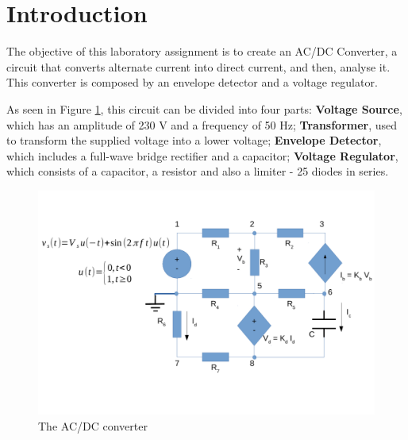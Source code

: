 \section{Introduction}
\label{sec:introduction}

The objective of this laboratory assignment is to create an AC/DC Converter, a circuit that converts alternate current into direct current, and then, analyse it. This converter is composed by an envelope detector and a voltage regulator.

As seen in Figure \ref{fig:rc}, this circuit can be divided into four parts: \textbf{Voltage Source}, which has an amplitude of 230 V and a frequency of 50 Hz; \textbf{Transformer}, used to transform the supplied voltage into a lower voltage; \textbf{Envelope Detector}, which includes a full-wave bridge rectifier and a capacitor; \textbf{Voltage Regulator}, which consists of a capacitor, a resistor and also a limiter - 25 diodes in series.


\begin{figure}[h] \centering
\includegraphics[width=0.99\linewidth]{rc.pdf}
\vspace{-5mm}
\caption{The AC/DC converter}
\label{fig:rc}
\end{figure}






